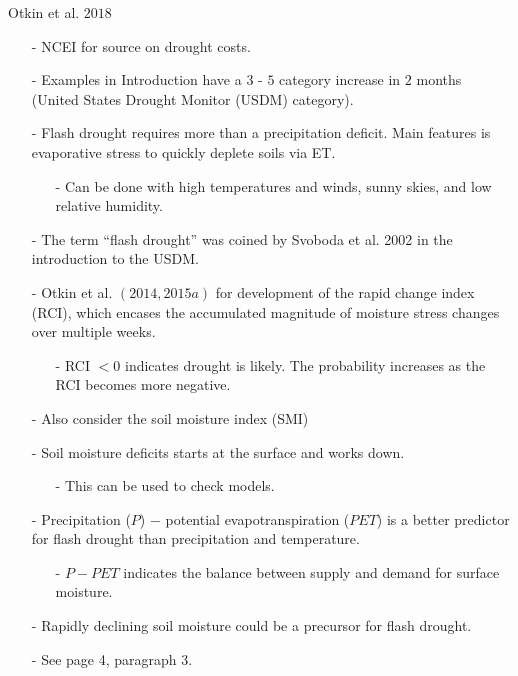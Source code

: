 \documentclass[12pt, letterpaper]{article}
\begin{document}
	Otkin et al. $2018$
	\begin{itemize}
		\item[-] NCEI for source on drought costs.
		\item[-] Examples in Introduction have a $3$ - $5$ category increase in $2$ months
		         (United States Drought Monitor (USDM) category).
		\item[-] Flash drought requires more than a precipitation deficit. Main features is evaporative 
		         stress to quickly deplete soils via ET.
		\begin{itemize}
			\item[-] Can be done with high temperatures and winds, sunny skies, and low relative humidity.
		\end{itemize}
	    \item[-] The term ``flash drought'' was coined by Svoboda et al. 2002 in the introduction to
	             the USDM.
	    \item[-] Otkin et al. $(2014, 2015a)$ for development of the  rapid change index (RCI),
	             which encases the accumulated magnitude of moisture stress changes over multiple weeks.
	    \begin{itemize}
	    	\item[-] RCI $< 0$ indicates drought is likely. The probability increases as the RCI
	    	         becomes more negative. 
	    \end{itemize}
        \item[-] Also consider the soil moisture index (SMI)
        \item[-] Soil moisture deficits starts at the surface and works down.
        \begin{itemize}
        	\item[-] This can be used to check models.
        \end{itemize}
        \item[-] Precipitation ($P$) $-$ potential evapotranspiration ($PET$) is a better predictor for
                 flash drought than precipitation and temperature.
        \begin{itemize}
        	\item[-] $P - PET$ indicates the balance between supply and demand for surface moisture.
        \end{itemize}
        \item[-] Rapidly declining soil moisture could be a precursor for flash drought.
        \item[-] See page 4, paragraph 3.

\end{itemize}
\end{document}
